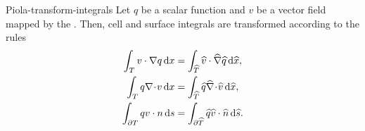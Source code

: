 \begin{Lemma}{Piola-transform-integrals}
  Let $q$ be a scalar function and $v$ be a 
  vector field mapped by the . Then, cell
  and surface integrals are transformed according to the rules
  \begin{gather}
    \begin{split}
      \int_{T} v \cdot \nabla q \,\mathrm{d} x
      &= \int_{\widehat {T}} \widehat v \cdot \widehat \nabla \widehat q \,\mathrm{d} \widehat x,
      \\
      \int_{T} q \nabla\!\cdot\! v \,\mathrm{d} x
      &= \int_{\widehat {T}} \widehat q \widehat \nabla\!\cdot\! \widehat v \,\mathrm{d} \widehat x,
      \\
      \int_{\partial T} q v\cdot n \,\mathrm{d} s
      &= \int_{\partial\widehat {T}} \widehat q \widehat v\cdot\widehat {n} \,\mathrm{d} \widehat s.
    \end{split}
  \end{gather}
\end{Lemma}

